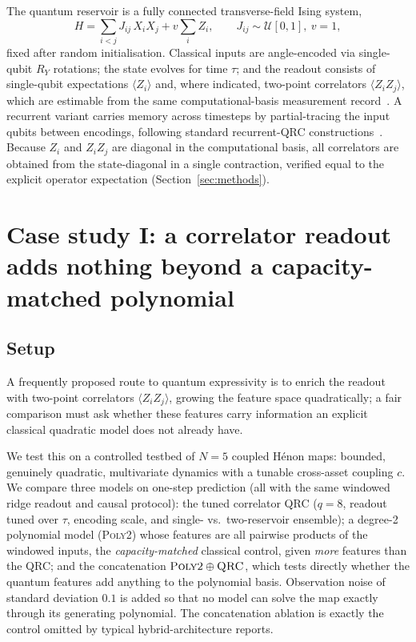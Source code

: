 ﻿\documentclass[10pt,conference]{IEEEtran}
\begin{document}
The quantum reservoir is a fully connected transverse-field Ising system,
\begin{equation}
H = \sum_{i<j} J_{ij}\, X_i X_j + v \sum_i Z_i,
\qquad J_{ij}\sim\mathcal{U}[0,1],\ v=1,
\end{equation}
fixed after random initialisation. Classical inputs are angle-encoded via
single-qubit $R_Y$ rotations; the state evolves for time $\tau$; and the readout
consists of single-qubit expectations $\langle Z_i\rangle$ and, where indicated,
two-point correlators $\langle Z_i Z_j\rangle$, which are estimable from the same
computational-basis measurement record~\cite{huang2020}. A recurrent variant
carries memory across timesteps by partial-tracing the input qubits between
encodings, following standard recurrent-QRC constructions~\cite{nakajima2019}.
Because $Z_i$ and $Z_iZ_j$ are diagonal in the computational basis, all
correlators are obtained from the state-diagonal in a single contraction,
verified equal to the explicit operator expectation (Section~\ref{sec:methods}).

\section{Case study I: a correlator readout adds nothing beyond a
capacity-matched polynomial}
\label{sec:corr}

\subsection{Setup}

A frequently proposed route to quantum expressivity is to enrich the readout with
two-point correlators $\langle Z_i Z_j\rangle$, growing the feature space
quadratically; a fair comparison must ask whether these features carry
information an explicit classical quadratic model does not already have.

We test this on a controlled testbed of $N=5$ coupled H\'enon maps: bounded,
genuinely quadratic, multivariate dynamics with a tunable cross-asset coupling
$c$. We compare three models on one-step prediction (all with the same windowed
ridge readout and causal protocol): the tuned correlator QRC ($q=8$, readout
tuned over $\tau$, encoding scale, and single- vs.\ two-reservoir ensemble); a
degree-2 polynomial model (\textsc{Poly2}) whose features are all pairwise
products of the windowed inputs, the \emph{capacity-matched} classical control,
given \emph{more} features than the QRC; and the concatenation
$\textsc{Poly2}\oplus\textsc{QRC}$, which tests directly whether the quantum
features add anything to the polynomial basis. Observation noise of standard deviation $0.1$ is added so that no model can solve
the map exactly through its generating polynomial. The concatenation ablation is
exactly the control omitted by typical hybrid-architecture reports.
\end{document}
